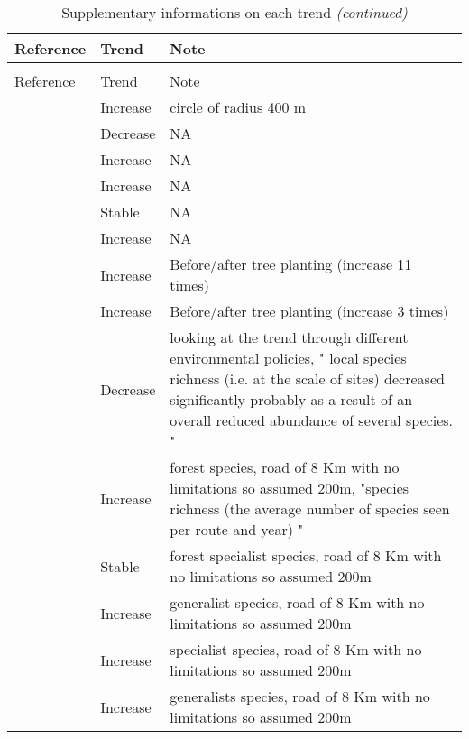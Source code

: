 \documentclass[
  12pt,
  oneside]{report}
\begin{document}
\begin{landscape}\begingroup\fontsize{10}{12}\selectfont

\begin{longtable}[t]{ll>{\raggedright\arraybackslash}p{40em}}
\caption{\label{tab:notetable}Supplementary informations on each trend}\\
\toprule
Reference & Trend & Note\\
\midrule
\endfirsthead
\caption[]{\label{tab:notetable}Supplementary informations on each trend \textit{(continued)}}\\
\toprule
Reference & Trend & Note\\
\midrule
\endhead

\endfoot
\bottomrule
\endlastfoot
\cite{barnagaud_temporal_2017} & Increase & circle of radius 400 m\\
\cite{barnagaud_temporal_2017} & Decrease & NA\\
\cite{barnagaud_temporal_2017} & Increase & \vphantom{2} NA\\
\cite{barnagaud_temporal_2017} & Increase & \vphantom{1} NA\\
\cite{barnagaud_temporal_2017} & Stable & NA\\
\addlinespace
\cite{barnagaud_temporal_2017} & Increase & NA\\
\cite{roels_recovery_2019} & Increase & Before/after tree planting (increase 11 times)\\
\cite{roels_recovery_2019} & Increase & Before/after tree planting (increase  3 times)\\
\cite{wretenberg_changes_2010} & Decrease & looking at the trend through different environmental policies, " local species richness (i.e. at the scale of sites) decreased significantly probably as a result of an overall reduced abundance of several species. "\\
\cite{ram_what_2017} & Increase & forest species, road of 8 Km with no limitations so assumed 200m, "species richness (the average number of species seen per route and year) "\\
\addlinespace
\cite{ram_what_2017} & Stable & forest specialist species, road of 8 Km with no limitations so assumed 200m\\
\cite{ram_what_2017} & Increase & generalist species, road of 8 Km with no limitations so assumed 200m\\
\cite{ram_what_2017} & Increase & specialist species, road of 8 Km with no limitations so assumed 200m\\
\cite{ram_what_2017} & Increase & generalists species, road of 8 Km with no limitations so assumed 200m\\

\end{longtable}
\end{landscape}
\end{document}

